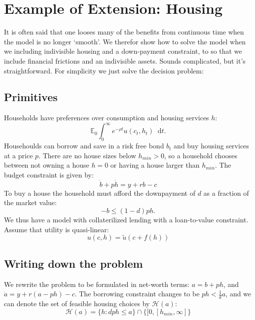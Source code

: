 \documentclass[12pt]{article}
\newcommand{\E}{\mathbb{E}}
\DeclareMathOperator{\1}{\mathbbm{1}}
\newcommand*\diff{\mathop{}\!\mathrm{d}}
\begin{document}
\section{Example of Extension: Housing}
It is often said that one looses many of the benefits from continuous time when the model is no longer `smooth'. We therefor show how to solve the model when we including indivisible housing and a down-payment constraint, to so that we include financial frictions and an indivisible assets. Sounds complicated, but it's straightforward. For simplicity we just solve the decision problem:

\subsection{Primitives}
Households have preferences over consumption and housing services $h$:
\begin{equation}
\E_0 \int_0^\infty e^{-\rho t} u(c_t,h_t)\diff t.
\end{equation}
Househoulds can borrow and save in a risk free bond $b_t$ and buy housing services at a price $p$. There are no house sizes below $h_{min}>0$, so a household chooses between not owning a house $h=0$ or having a house larger than $h_{min}$. The budget constraint is given by:
\begin{equation*}
\dot b + p \dot h = y +r b - c
\end{equation*}
To buy a house the household must afford the downpayment of $d$ as a fraction of the market value:
\begin{equation*}
-b \le (1-d)ph.
\end{equation*}
We thus have a model with collaterilized lending with a loan-to-value constraint. Assume that utility is quasi-linear:
\begin{equation}
u(c,h)=\tilde u(c + f(h)) 
\end{equation}

\subsection{Writing down the problem}
We rewrite the problem to be formulated in net-worth terms: $ a=b+ph $, and $\dot a = y + r(a - ph) -c$. The borrowing constraint changes to be $ph<\frac{1}{d} a$,  and we can denote the set of feasible housing choices by $\mathcal{H}(a)$:
\begin{equation*}
\mathcal{H}(a) = \{h: dph \le a  \} \cap \{[0,[h_{min},\infty] \}
\end{equation*}
\end{document}
